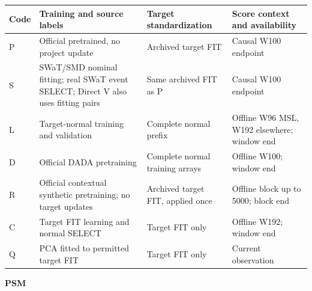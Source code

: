 \documentclass[
  english,
  10pt,
]{article}
\begin{document}
\begin{longtable}[]{@{}
  >{\raggedright\arraybackslash}p{}
  >{\raggedright\arraybackslash}p{}
  >{\raggedright\arraybackslash}p{}
  >{\raggedright\arraybackslash}p{}@{}}
\toprule\noalign{}
\begin{minipage}[b]{\linewidth}\raggedright
Code
\end{minipage} & \begin{minipage}[b]{\linewidth}\raggedright
Training and source labels
\end{minipage} & \begin{minipage}[b]{\linewidth}\raggedright
Target standardization
\end{minipage} & \begin{minipage}[b]{\linewidth}\raggedright
Score context and availability
\end{minipage} \\
\midrule\noalign{}
\endhead
\bottomrule\noalign{}
\endlastfoot
P & Official pretrained, no project update & Archived target FIT &
Causal W100 endpoint \\
S & SWaT/SMD nominal fitting; real SWaT event SELECT; Direct V also uses
fitting pairs & Same archived FIT as P & Causal W100 endpoint \\
L & Target-normal training and validation & Complete normal prefix &
Offline W96 MSL, W192 elsewhere; window end \\
D & Official DADA pretraining & Complete normal training arrays &
Offline W100; window end \\
R & Official contextual synthetic pretraining; no target updates &
Archived target FIT, applied once & Offline block up to 5000; block
end \\
C & Target FIT learning and normal SELECT & Target FIT only & Offline
W192; window end \\
Q & PCA fitted to permitted target FIT & Target FIT only & Current
observation \\
\end{longtable}


\textbf{PSM}
\end{document}
